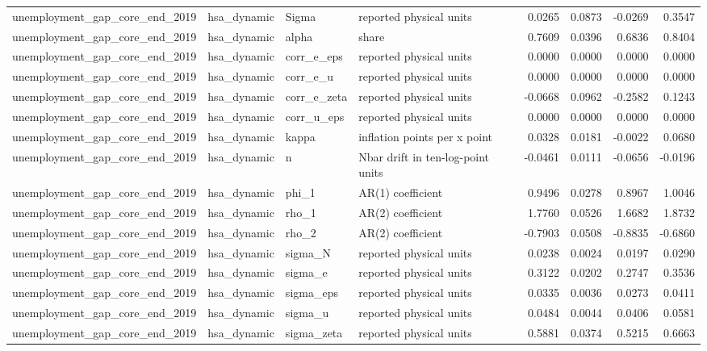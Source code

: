 \begin{tabular}{llllrrrr}
unemployment\_gap\_core\_end\_2019 & hsa\_dynamic & Sigma & reported physical units & 0.0265 & 0.0873 & -0.0269 & 0.3547 \\
unemployment\_gap\_core\_end\_2019 & hsa\_dynamic & alpha & share & 0.7609 & 0.0396 & 0.6836 & 0.8404 \\
unemployment\_gap\_core\_end\_2019 & hsa\_dynamic & corr\_e\_eps & reported physical units & 0.0000 & 0.0000 & 0.0000 & 0.0000 \\
unemployment\_gap\_core\_end\_2019 & hsa\_dynamic & corr\_e\_u & reported physical units & 0.0000 & 0.0000 & 0.0000 & 0.0000 \\
unemployment\_gap\_core\_end\_2019 & hsa\_dynamic & corr\_e\_zeta & reported physical units & -0.0668 & 0.0962 & -0.2582 & 0.1243 \\
unemployment\_gap\_core\_end\_2019 & hsa\_dynamic & corr\_u\_eps & reported physical units & 0.0000 & 0.0000 & 0.0000 & 0.0000 \\
unemployment\_gap\_core\_end\_2019 & hsa\_dynamic & kappa & inflation points per x point & 0.0328 & 0.0181 & -0.0022 & 0.0680 \\
unemployment\_gap\_core\_end\_2019 & hsa\_dynamic & n & Nbar drift in ten-log-point units & -0.0461 & 0.0111 & -0.0656 & -0.0196 \\
unemployment\_gap\_core\_end\_2019 & hsa\_dynamic & phi\_1 & AR(1) coefficient & 0.9496 & 0.0278 & 0.8967 & 1.0046 \\
unemployment\_gap\_core\_end\_2019 & hsa\_dynamic & rho\_1 & AR(2) coefficient & 1.7760 & 0.0526 & 1.6682 & 1.8732 \\
unemployment\_gap\_core\_end\_2019 & hsa\_dynamic & rho\_2 & AR(2) coefficient & -0.7903 & 0.0508 & -0.8835 & -0.6860 \\
unemployment\_gap\_core\_end\_2019 & hsa\_dynamic & sigma\_N & reported physical units & 0.0238 & 0.0024 & 0.0197 & 0.0290 \\
unemployment\_gap\_core\_end\_2019 & hsa\_dynamic & sigma\_e & reported physical units & 0.3122 & 0.0202 & 0.2747 & 0.3536 \\
unemployment\_gap\_core\_end\_2019 & hsa\_dynamic & sigma\_eps & reported physical units & 0.0335 & 0.0036 & 0.0273 & 0.0411 \\
unemployment\_gap\_core\_end\_2019 & hsa\_dynamic & sigma\_u & reported physical units & 0.0484 & 0.0044 & 0.0406 & 0.0581 \\
unemployment\_gap\_core\_end\_2019 & hsa\_dynamic & sigma\_zeta & reported physical units & 0.5881 & 0.0374 & 0.5215 & 0.6663 \\

\end{tabular}
